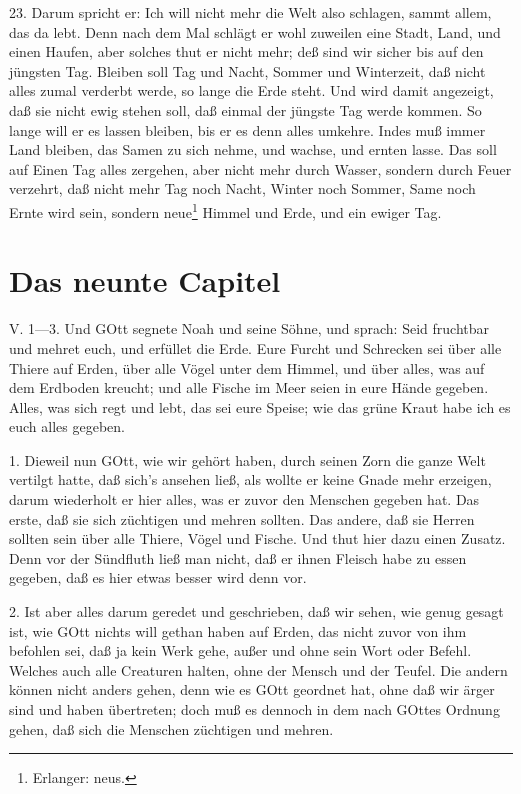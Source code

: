 23. Darum spricht er: Ich will nicht mehr die Welt also schlagen, sammt allem, das da lebt. Denn nach dem Mal schlägt er wohl zuweilen eine Stadt, Land, und einen Haufen, aber solches thut er nicht mehr; deß sind wir sicher bis auf den jüngsten Tag. Bleiben soll Tag und Nacht, Sommer und Winterzeit, daß nicht alles zumal verderbt werde, so lange die Erde steht. Und wird damit angezeigt, daß sie nicht ewig stehen soll, daß einmal der jüngste Tag werde kommen. So lange will er es lassen bleiben, bis er es denn alles umkehre. Indes muß immer Land bleiben, das Samen zu sich nehme, und wachse, und ernten lasse. Das soll auf Einen Tag alles zergehen, aber nicht mehr durch Wasser, sondern durch Feuer verzehrt, daß nicht mehr Tag noch Nacht, Winter noch Sommer, Same noch Ernte wird sein, sondern neue\footnote{Erlanger: neus.} Himmel und Erde, und ein ewiger Tag.

\section{Das neunte Capitel}

\begin{schriftzitat}
V. 1—3. Und GOtt segnete Noah und seine Söhne, und sprach: Seid fruchtbar und mehret euch, und erfüllet die Erde. Eure Furcht und Schrecken sei über alle Thiere auf Erden, über alle Vögel unter dem Himmel, und über alles, was auf dem Erdboden kreucht; und alle Fische im Meer seien in eure Hände gegeben. Alles, was sich regt und lebt, das sei eure Speise; wie das grüne Kraut habe ich es euch alles gegeben.
\end{schriftzitat}

1. Dieweil nun GOtt, wie wir gehört haben, durch seinen Zorn die ganze Welt vertilgt hatte, daß sich's ansehen ließ, als wollte er keine Gnade mehr erzeigen, darum wiederholt er hier alles, was er zuvor den Menschen gegeben hat. Das erste, daß sie sich züchtigen und mehren sollten. Das andere, daß sie Herren sollten sein über alle Thiere, Vögel und Fische. Und thut hier dazu einen Zusatz. Denn vor der Sündfluth ließ man nicht, daß er ihnen Fleisch habe zu essen gegeben, daß es hier etwas besser wird denn vor.

2. Ist aber alles darum geredet und geschrieben, daß wir sehen, wie genug gesagt ist, wie GOtt nichts will gethan haben auf Erden, das nicht zuvor von ihm befohlen sei, daß ja kein Werk gehe, außer und ohne sein Wort oder Befehl. Welches auch alle Creaturen halten, ohne der Mensch und der Teufel. Die andern können nicht anders gehen, denn wie es GOtt geordnet hat, ohne daß wir ärger sind und haben übertreten; doch muß es dennoch in dem nach GOttes Ordnung gehen, daß sich die Menschen züchtigen und mehren.

